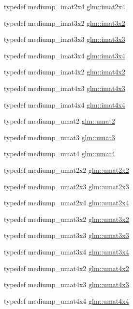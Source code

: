 \begin{DoxyCompactItemize}
\item 
typedef mediump\-\_\-imat2x4 \hyperlink{group__gtc__matrix__integer_gafe2d058e164fd1badace451ffcf4ae46}{glm\-::imat2x4}
\item 
typedef mediump\-\_\-imat3x2 \hyperlink{group__gtc__matrix__integer_ga04deef94cdfdd3b3b2706e10a32ef7f3}{glm\-::imat3x2}
\item 
typedef mediump\-\_\-imat3x3 \hyperlink{group__gtc__matrix__integer_gaeff9ef8f56cccc828d6b897923e75402}{glm\-::imat3x3}
\item 
typedef mediump\-\_\-imat3x4 \hyperlink{group__gtc__matrix__integer_gaee5507e6cbbdd05841a0c174e60dd036}{glm\-::imat3x4}
\item 
typedef mediump\-\_\-imat4x2 \hyperlink{group__gtc__matrix__integer_ga7e733984837e0e7aa9f4aac18f632f63}{glm\-::imat4x2}
\item 
typedef mediump\-\_\-imat4x3 \hyperlink{group__gtc__matrix__integer_gaa4cca8e80c0603239eda452860063844}{glm\-::imat4x3}
\item 
typedef mediump\-\_\-imat4x4 \hyperlink{group__gtc__matrix__integer_ga367d8d5281ff82f1215a227dd2ea5ba9}{glm\-::imat4x4}
\item 
typedef mediump\-\_\-umat2 \hyperlink{group__gtc__matrix__integer_gae2d45c058cfa0b60ab4df0cdda2d8516}{glm\-::umat2}
\item 
typedef mediump\-\_\-umat3 \hyperlink{group__gtc__matrix__integer_ga8b8fbc858e28abf8fc344744f8d6d368}{glm\-::umat3}
\item 
typedef mediump\-\_\-umat4 \hyperlink{group__gtc__matrix__integer_ga7ae562000d8a8d193e9f93cf51e2e113}{glm\-::umat4}
\item 
typedef mediump\-\_\-umat2x2 \hyperlink{group__gtc__matrix__integer_gad3c997b31dd69bdb4787867e758ed48d}{glm\-::umat2x2}
\item 
typedef mediump\-\_\-umat2x3 \hyperlink{group__gtc__matrix__integer_ga890ae28f9230794138b2c89f44ce3376}{glm\-::umat2x3}
\item 
typedef mediump\-\_\-umat2x4 \hyperlink{group__gtc__matrix__integer_ga3b23b164240cf4dfb429776da7be9d88}{glm\-::umat2x4}
\item 
typedef mediump\-\_\-umat3x2 \hyperlink{group__gtc__matrix__integer_ga257300f2710612877ef45438a366e308}{glm\-::umat3x2}
\item 
typedef mediump\-\_\-umat3x3 \hyperlink{group__gtc__matrix__integer_gab80b6501ba1b2c40119a0f2d256f4c97}{glm\-::umat3x3}
\item 
typedef mediump\-\_\-umat3x4 \hyperlink{group__gtc__matrix__integer_ga5410857d098a989a30b4017100bc2ff7}{glm\-::umat3x4}
\item 
typedef mediump\-\_\-umat4x2 \hyperlink{group__gtc__matrix__integer_ga13e8392218e9b6e1b7f194a21b5c88bf}{glm\-::umat4x2}
\item 
typedef mediump\-\_\-umat4x3 \hyperlink{group__gtc__matrix__integer_ga08373f5588a54da1a48e5e55c7d51004}{glm\-::umat4x3}
\item 
typedef mediump\-\_\-umat4x4 \hyperlink{group__gtc__matrix__integer_gae0931b79e808fb0983848778a60eb548}{glm\-::umat4x4}
\end{DoxyCompactItemize}


